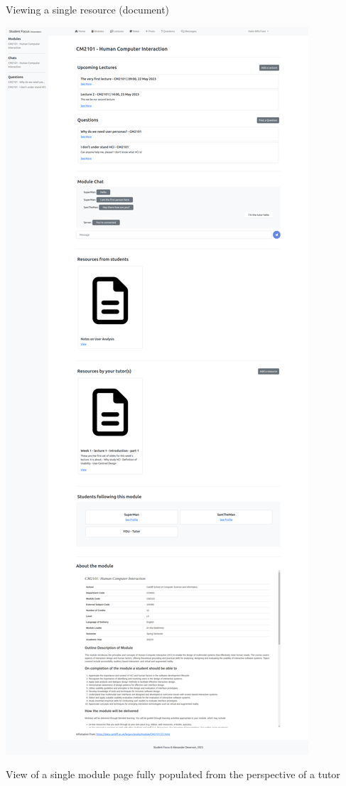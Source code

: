 Viewing a single resource (document)

\includegraphics[scale=0.10]{images/application/36 - tutor_module_page_populated.png}

View of a single module page fully populated from the perspective of a tutor

